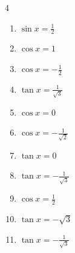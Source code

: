 \begin{multicols}{4}
\begin{enumerate}

  \item $\displaystyle \sin{x}  = \frac{1}{2}$


  \item $\displaystyle \cos{x}  = 1$

        \phantom{$\displaystyle x = 0$}

  \item $\displaystyle \cos{x}  = -\frac{1}{2}$


  \item $\displaystyle \tan{x}  = \frac{1}{\sqrt{3}}$


  \item $\displaystyle \cos{x}  = 0$


  \item $\displaystyle \cos{x}  = -\frac{1}{\sqrt{2}}$


  \item $\displaystyle \tan{x}  = 0$

        \phantom{$\displaystyle x = 0 , \pi$}

  \item $\displaystyle \tan{x}  = -\frac{1}{\sqrt{3}}$


  \item $\displaystyle \cos{x}  = \frac{1}{2}$


  \item $\displaystyle \tan{x}  = -\sqrt{3}$


  \item $\displaystyle \tan{x}  = -\frac{1}{\sqrt{3}}$



\end{enumerate}
\end{multicols}
